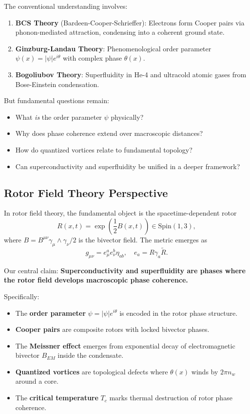 \documentclass[12pt,a4paper]{article}
\theoremstyle{definition}
\theoremstyle{remark}
\begin{document}
The conventional understanding involves:
\begin{enumerate}
\item \textbf{BCS Theory} (Bardeen-Cooper-Schrieffer): Electrons form Cooper pairs via phonon-mediated attraction, condensing into a coherent ground state.
\item \textbf{Ginzburg-Landau Theory}: Phenomenological order parameter $\psi(x) = |\psi| e^{i\theta}$ with complex phase $\theta(x)$.
\item \textbf{Bogoliubov Theory}: Superfluidity in He-4 and ultracold atomic gases from Bose-Einstein condensation.
\end{enumerate}

But fundamental questions remain:
\begin{itemize}
\item What \emph{is} the order parameter $\psi$ physically?
\item Why does phase coherence extend over macroscopic distances?
\item How do quantized vortices relate to fundamental topology?
\item Can superconductivity and superfluidity be unified in a deeper framework?
\end{itemize}

\subsection{Rotor Field Theory Perspective}

In rotor field theory, the fundamental object is the spacetime-dependent rotor
\begin{equation}
R(x,t) = \exp\left(\frac{1}{2} B(x,t)\right) \in \mathrm{Spin}(1,3),
\end{equation}
where $B = B^{\mu\nu} \gamma_\mu \wedge \gamma_\nu / 2$ is the bivector field. The metric emerges as
\begin{equation}
g_{\mu\nu} = e_\mu^a e_\nu^b \eta_{ab}, \quad e_a = R \gamma_a \tilde{R}.
\end{equation}

Our central claim: \textbf{Superconductivity and superfluidity are phases where the rotor field develops macroscopic phase coherence.}

Specifically:
\begin{itemize}
\item The \textbf{order parameter} $\psi = |\psi| e^{i\theta}$ is encoded in the rotor phase structure.
\item \textbf{Cooper pairs} are composite rotors with locked bivector phases.
\item The \textbf{Meissner effect} emerges from exponential decay of electromagnetic bivector $B_{EM}$ inside the condensate.
\item \textbf{Quantized vortices} are topological defects where $\theta(x)$ winds by $2\pi n_w$ around a core.
\item The \textbf{critical temperature} $T_c$ marks thermal destruction of rotor phase coherence.
\end{itemize}
\end{document}
